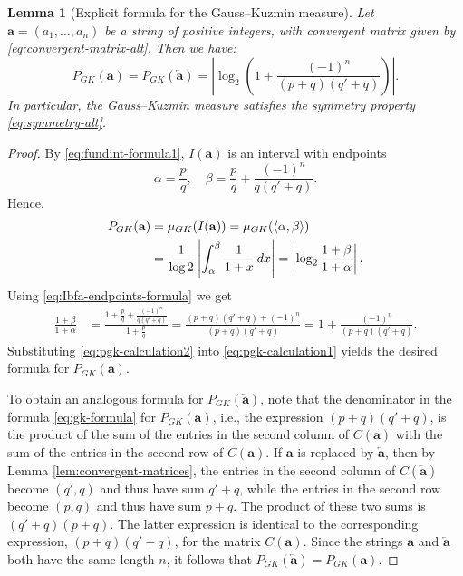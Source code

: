 \documentclass[10pt]{article}
\newtheorem{lemma}{Lemma}
\theoremstyle{definition}
\numberwithin{equation}{section}
\numberwithin{lemma}{section}
\newcommand{\bfa}{\mathbf{a}}
\newcommand{\bfar}{\overleftarrow{\bfa}}
\newcommand{\fundint}[1]{\langle #1\rangle}
\begin{document}
\begin{lemma}[Explicit formula for the Gauss--Kuzmin measure]
\label{lem:gk-formulas}
Let $\bfa=(a_1,\dots,a_n)$
be a string of positive integers, with convergent matrix
given by \eqref{eq:convergent-matrix-alt}.  
Then we have:
\begin{equation}
\label{eq:gk-formula}
P_{GK}(\bfa) = P_{GK}(\bfar) 
= \left|\log_2\left(1+\frac{(-1)^n}{(p+q)(q'+q)}\right)\right|.
\end{equation}
In particular, the Gauss--Kuzmin measure satisfies the symmetry property 
\eqref{eq:symmetry-alt}.
\end{lemma}

\begin{proof}
By \eqref{eq:fundint-formula1}, $I(\bfa)$ is an
interval with endpoints
\begin{equation}
\label{eq:Ibfa-endpoints-formula}
\alpha=\frac{p}{q}, \quad 
\beta=\frac{p}{q}+\frac{(-1)^n}{q(q'+q)}.
\end{equation}
Hence,
\begin{align}
\notag
P_{GK}(\bfa)
&=\mu_{GK}(I(\bfa))=
\mu_{GK}(\fundint{\alpha,\beta})
\\
\label{eq:pgk-calculation1}
&=\frac1{\log 2}
\left|\int_{\alpha}^\beta \frac1{1+x}\,dx\right|
=\left|\log_2\frac{1+\beta}{1+\alpha}\right|.
\end{align}
Using \eqref{eq:Ibfa-endpoints-formula} we get
\begin{align}
\label{eq:pgk-calculation2}
\frac{1+\beta}{1+\alpha} 
&=\frac{1+\frac{p}{q}+\frac{(-1)^n}{q(q'+q)}}
{1+\frac{p}{q}}
=\frac{(p+q)(q'+q)+(-1)^n}{(p+q)(q'+q)}
=1+\frac{(-1)^n}{(p+q)(q'+q)}.
\end{align}
Substituting \eqref{eq:pgk-calculation2}
into \eqref{eq:pgk-calculation1} yields the desired formula for 
$P_{GK}(\bfa)$.

To obtain an analogous formula for $P_{GK}(\bfar)$,
note that the denominator in the formula
\eqref{eq:gk-formula}
for $P_{GK}(\bfa)$, i.e., the expression $(p+q)(q'+q)$, 
is the product of the sum of the entries in the second column of $C(\bfa)$
with the sum of the entries in the second row of $C(\bfa)$.
If $\bfa$ is replaced by $\bfar$, then by Lemma 
\ref{lem:convergent-matrices}, the entries in the second column of
$C(\bfar)$ become $(q',q)$ and thus have sum $q'+q$, while the entries
in the second row become $(p,q)$ and thus have sum $p+q$. The 
product of these two sums is $(q'+q)(p+q)$. The latter expression 
is identical to the corresponding expression, 
$(p+q)(q'+q)$, for the matrix $C(\bfa)$. Since the strings $\bfa$ and
$\bfar$ both have the same length $n$, it follows that
$P_{GK}(\bfar)=P_{GK}(\bfa)$.
\end{proof}
\end{document}
